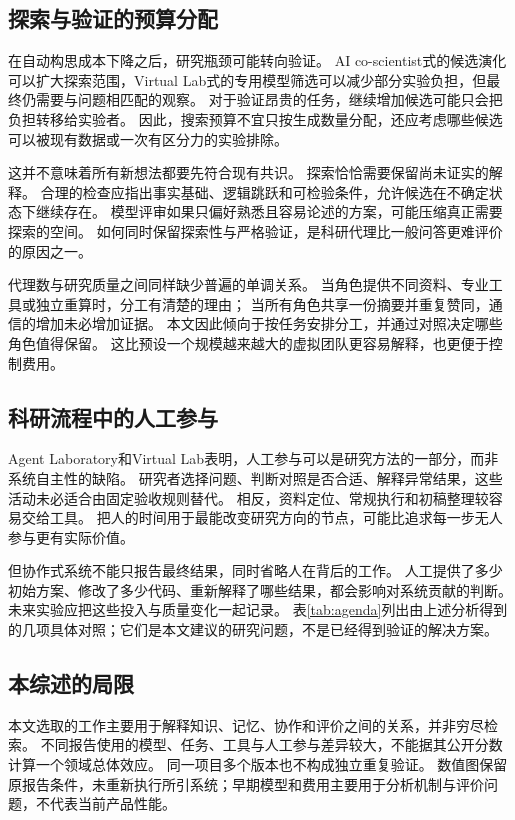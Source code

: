 \subsection{探索与验证的预算分配}
在自动构思成本下降之后，研究瓶颈可能转向验证。
AI co-scientist式的候选演化可以扩大探索范围，Virtual Lab式的专用模型筛选可以减少部分实验负担，但最终仍需要与问题相匹配的观察。
对于验证昂贵的任务，继续增加候选可能只会把负担转移给实验者。
因此，搜索预算不宜只按生成数量分配，还应考虑哪些候选可以被现有数据或一次有区分力的实验排除。

这并不意味着所有新想法都要先符合现有共识。
探索恰恰需要保留尚未证实的解释。
合理的检查应指出事实基础、逻辑跳跃和可检验条件，允许候选在不确定状态下继续存在。
模型评审如果只偏好熟悉且容易论述的方案，可能压缩真正需要探索的空间。
如何同时保留探索性与严格验证，是科研代理比一般问答更难评价的原因之一。

代理数与研究质量之间同样缺少普遍的单调关系。
当角色提供不同资料、专业工具或独立重算时，分工有清楚的理由；
当所有角色共享一份摘要并重复赞同，通信的增加未必增加证据。
本文因此倾向于按任务安排分工，并通过对照决定哪些角色值得保留。
这比预设一个规模越来越大的虚拟团队更容易解释，也更便于控制费用。

\subsection{科研流程中的人工参与}
Agent Laboratory和Virtual Lab表明，人工参与可以是研究方法的一部分，而非系统自主性的缺陷\cite{lab,virtual}。
研究者选择问题、判断对照是否合适、解释异常结果，这些活动未必适合由固定验收规则替代。
相反，资料定位、常规执行和初稿整理较容易交给工具。
把人的时间用于最能改变研究方向的节点，可能比追求每一步无人参与更有实际价值。

但协作式系统不能只报告最终结果，同时省略人在背后的工作。
人工提供了多少初始方案、修改了多少代码、重新解释了哪些结果，都会影响对系统贡献的判断。
未来实验应把这些投入与质量变化一起记录。
表\ref{tab:agenda}列出由上述分析得到的几项具体对照；它们是本文建议的研究问题，不是已经得到验证的解决方案。


\subsection{本综述的局限}
本文选取的工作主要用于解释知识、记忆、协作和评价之间的关系，并非穷尽检索。
不同报告使用的模型、任务、工具与人工参与差异较大，不能据其公开分数计算一个领域总体效应。
同一项目多个版本也不构成独立重复验证。
数值图保留原报告条件，未重新执行所引系统；早期模型和费用主要用于分析机制与评价问题，不代表当前产品性能。

